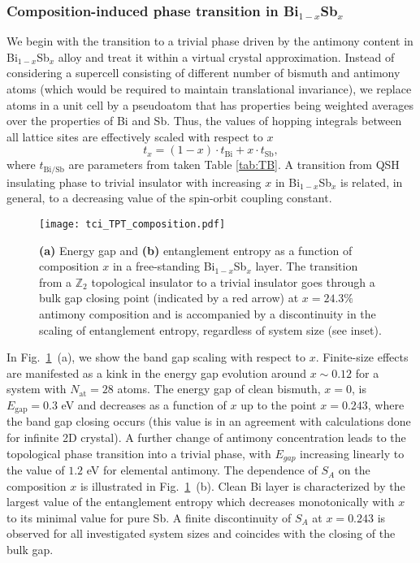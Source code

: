 \subsubsection{Composition-induced phase transition in Bi$_{1-x}$Sb$_x$}
We begin with the transition to a trivial phase driven by the antimony content in Bi$_{1-x}$Sb$_x$ alloy and treat it within a virtual crystal approximation. Instead of considering a supercell consisting of different number of bismuth and antimony atoms (which would be required to maintain translational invariance), we replace atoms in a unit cell by a pseudoatom that has properties being weighted averages over the properties of Bi and Sb. Thus, the values of hopping integrals between all lattice sites are effectively scaled with respect to $x$
\begin{equation}
t_x = (1-x) \cdot t_{\mathrm{Bi}} + x\cdot t_{\mathrm{Sb}},
\label{eq:VCA}
\end{equation}
where $t_{\mathrm{Bi/Sb}}$ are parameters from taken Table \ref{tab:TB}. A transition from QSH insulating phase to trivial insulator with increasing $x$ in Bi$_{1-x}$Sb$_x$ is related, in general, to a decreasing value of the spin-orbit coupling constant. 

\begin{figure}[H]
\centering
\texttt{[image: tci\_TPT\_composition.pdf]}
\caption[Energy gap and entanglement entropy as a function of composition $x$ in free-standing Bi$_{1-x}$Sb$_x$]{\textbf{(a)} Energy gap and \textbf{(b)} entanglement entropy as a function of composition $x$ in a free-standing Bi$_{1-x}$Sb$_x$ layer. The transition from a $\mathbb{Z}_2$ topological insulator to a trivial insulator goes through a bulk gap closing point (indicated by a red arrow) at $ x = 24.3 \%$ antimony composition and is accompanied by a discontinuity in the scaling of entanglement entropy, regardless of system size (see inset).}
\label{fig:TPT_composition}
\end{figure}

In Fig.~\ref{fig:TPT_composition}~(a), we show the band gap scaling with respect to $x$. Finite-size effects are manifested as a kink in the energy gap evolution around $x\sim 0.12$ for a system with $N_{\mathrm{at}} = 28$ atoms. The energy gap of clean bismuth, $x = 0$, is $ E_{\mathrm{gap}} = 0.3$ eV and decreases as a function of $x$ up to the point $x = 0.243$, where the band gap closing occurs (this value is in an agreement with calculations done for infinite 2D crystal). A further change of antimony concentration leads to the topological phase transition into a trivial phase, with $E_{gap}$ increasing linearly to the value of $1.2$ eV for elemental antimony. The dependence of $S_A$ on the composition $x$ is illustrated in Fig.~\ref{fig:TPT_composition}~(b). Clean Bi layer is characterized by the largest value of the entanglement entropy which decreases monotonically with $x$ to its minimal value for pure Sb. A finite discontinuity of $S_A$ at $x = 0.243$ is observed for all investigated system sizes and coincides with the closing of the bulk gap.

